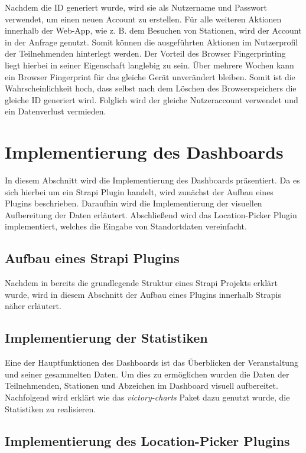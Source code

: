 Nachdem die ID generiert wurde, wird sie als Nutzername und Passwort verwendet,
um einen neuen Account zu erstellen. Für alle weiteren Aktionen innerhalb der
Web-App, wie z. B. dem Besuchen von Stationen, wird der Account in der Anfrage
genutzt. Somit können die ausgeführten Aktionen im Nutzerprofil der
Teilnehmenden hinterlegt werden. Der Vorteil des Browser Fingerprinting liegt
hierbei in seiner Eigenschaft langlebig zu sein. Über mehrere Wochen kann
ein Browser Fingerprint für das gleiche Gerät unverändert bleiben. Somit ist die
Wahrscheinlichkeit hoch, dass selbst nach dem Löschen des Browserspeichers die
gleiche ID generiert wird. Folglich wird der gleiche Nutzeraccount verwendet und
ein Datenverlust vermieden.

\section{Implementierung des Dashboards} \label{sec:impl-dashboard}

In diesem Abschnitt wird die Implementierung des Dashboards präsentiert. Da es
sich hierbei um ein Strapi Plugin handelt, wird zunächst der Aufbau eines
Plugins beschrieben. Daraufhin wird die Implementierung der visuellen
Aufbereitung der Daten erläutert. Abschließend wird das Location-Picker Plugin
implementiert, welches die Eingabe von Standortdaten vereinfacht.

\subsection{Aufbau eines Strapi Plugins}

Nachdem in  bereits die grundlegende
Struktur eines Strapi Projekts erklärt wurde, wird in diesem Abschnitt der
Aufbau eines Plugins innerhalb Strapis näher erläutert.

\subsection{Implementierung der Statistiken}

Eine der Hauptfunktionen des Dashboards ist das Überblicken der Veranstaltung
und seiner gesammelten Daten. Um dies zu ermöglichen wurden die Daten der
Teilnehmenden, Stationen und Abzeichen im Dashboard visuell aufbereitet.
Nachfolgend wird erklärt wie das \textit{victory-charts} Paket dazu genutzt
wurde, die Statistiken zu realisieren.

\subsection{Implementierung des Location-Picker Plugins}

